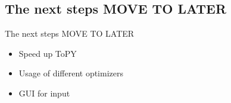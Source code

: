 
\subsection{The next steps MOVE TO LATER}
\begin{frame}{The next steps MOVE TO LATER}
\begin{itemize}
\item Speed up ToPY
\item Usage of different optimizers
\item GUI for input
\end{itemize}
\end{frame}